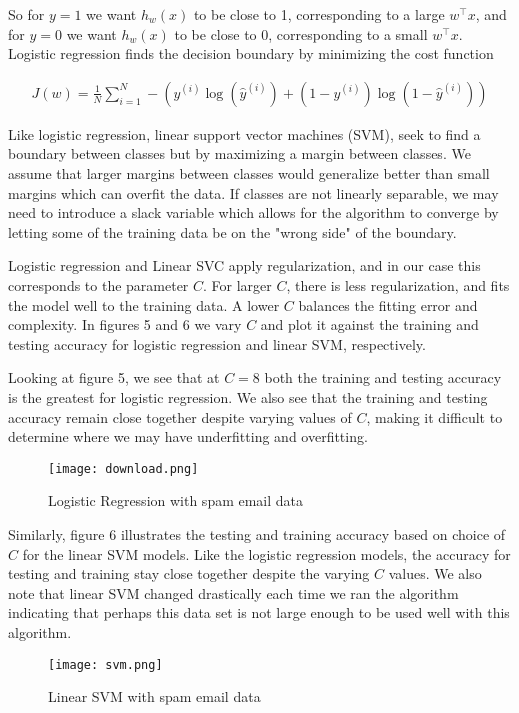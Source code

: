 \documentclass[12pt,letterpaper]{article}
\begin{document}
So for $y=1$ we want $h_w(x)$ to be close to 1, corresponding to a large $w^\top x$, and for $y=0$ we want $h_w(x)$ to be close to 0, corresponding to a small $w^\top x$. Logistic regression finds the decision boundary by minimizing the cost function

\begin{align}
	J(w)=\frac{1}{N}\sum_{i=1}^{N}-(y^{(i)}\log(\hat{y}^{(i)})+(1-y^{(i)})\log(1-\hat{y}^{(i)}))
\end{align}

Like logistic regression, linear support vector machines (SVM), seek to find a boundary between classes but by maximizing a margin between classes. We assume that larger margins between classes would generalize better than small margins which can overfit the data. If classes are not linearly separable, we may need to introduce a slack variable which allows for the algorithm to converge by letting some of the training data be on the "wrong side" of the boundary.

Logistic regression and Linear SVC apply regularization, and in our case this corresponds to the parameter $C$. For larger $C$, there is less regularization, and fits the model well to the training data. A lower $C$ balances the fitting error and complexity. In figures 5 and 6 we vary $C$ and plot it against the training and testing accuracy for logistic regression and linear SVM, respectively.

Looking at figure 5, we see that at $C=8$ both the training and testing accuracy is the greatest for logistic regression. We also see that the training and testing accuracy remain close together despite varying values of $C$, making it difficult to determine where we may have underfitting and overfitting.

\begin{figure}[h]
	\centering
	\texttt{[image: download.png]}
	\caption{Logistic Regression with spam email data}
\end{figure}

Similarly, figure 6 illustrates the testing and training accuracy based on choice of $C$ for the linear SVM models. Like the logistic regression models, the accuracy for testing and training stay close together despite the varying $C$ values. We also note that linear SVM changed drastically each time we ran the algorithm indicating that perhaps this data set is not large enough to be used well with this algorithm.

\begin{figure}[h]
	\centering
	\texttt{[image: svm.png]}
	\caption{Linear SVM with spam email data}
\end{figure}
\end{document}
